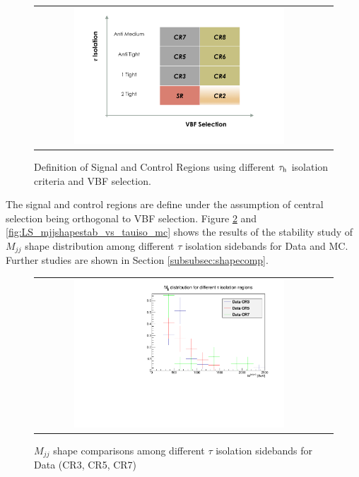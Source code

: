 \begin{figure}[tbh!]
    \centering
    \begin{tabular}{cc}
      \includegraphics[width=0.75\textwidth]{PLOTS/diTauHadLSotherPlots/controlregions.png}
    \end{tabular}
    \caption{Definition of Signal and Control Regions using different $\tau_{\text{h}}$ isolation criteria and VBF selection.}
    \label{fig:crs}
  \end{figure}
  
  The signal and control regions are define under the assumption of central selection being orthogonal to VBF selection. Figure \ref{fig:LS_mjjshapestab_vs_tauiso_data} and \ref{fig:LS_mjjshapestab_vs_tauiso_mc} shows the results of the stability study of $M_{jj}$ shape distribution among different $\tau$ isolation sidebands for Data and MC. Further studies are shown in Section \ref{subsubsec:shapecomp}.
  
    \begin{figure}[tbh!]
        \centering
        \begin{tabular}{cc}
          \includegraphics[width=0.75\textwidth]{PLOTS/diTauHadLSotherPlots/LS_mjjshapestab_vs_tauiso_data.pdf}
        \end{tabular}
        \caption{$M_{jj}$ shape comparisons among different $\tau$ isolation sidebands for Data (CR3, CR5, CR7)}
        \label{fig:LS_mjjshapestab_vs_tauiso_data}
      \end{figure}
  

